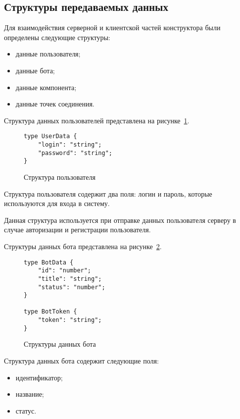 

\subsection{Структуры передаваемых данных}

Для взаимодействия серверной и клиентской частей конструктора были определены
следующие структуры:
\begin{itemize}
	\item данные пользователя;
	\item данные бота;
	\item данные компонента;
	\item данные точек соединения.
\end{itemize}

Структура данных пользователей представлена на рисунке~\ref{f:user-data-struct-code}.

\begin{figure}[ht]
	\centering
	\vspace{\toppaddingoffigure}
	\begin{lstlisting}
type UserData {
    "login": "string";
    "password": "string";
}
    \end{lstlisting}
	\caption{Структура пользователя}
	\label{f:user-data-struct-code}
\end{figure}


Структура пользователя содержит два поля: логин и пароль, которые
используются для входа в систему.

Данная структура используется при отправке данных пользователя
серверу в случае авторизации и регистрации пользователя.

Структуры данных бота представлена на рисунке~\ref{f:bot-data-struct-code}.

\begin{figure}[ht]
	\centering
	\vspace{\toppaddingoffigure}
	\begin{lstlisting}
type BotData {
    "id": "number";
    "title": "string";
    "status": "number";
}

type BotToken {
    "token": "string";
}
    \end{lstlisting}
	\caption{Структуры данных бота}
	\label{f:bot-data-struct-code}
\end{figure}

Структура данных бота содержит следующие поля:
\begin{itemize}
	\item идентификатор;
	\item название;
	\item статус.
\end{itemize}

